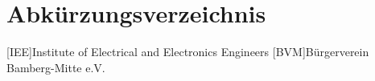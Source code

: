 \chapter*{Abkürzungsverzeichnis}

\begin{acronym}
    [IEE]{Institute of Electrical and Electronics Engineers}
    [BVM]{Bürgerverein Bamberg-Mitte e.V.}
\end{acronym}